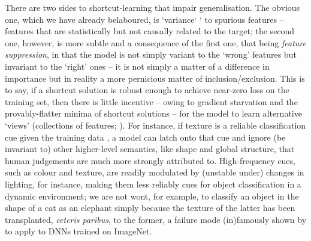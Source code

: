 There are two sides to shortcut-learning that impair generalisation.
%
The obvious one, which we have already belaboured, is `variance` ` to spurious features -- features
that are statistically but not causally related to the target; the second one, however, is more
subtle and a consequence of the first one, that being \emph{feature suppression}, in that the model
is not simply variant to the `wrong' features but invariant to the `right' ones -- it is not simply
a matter of a difference in importance but in reality a more pernicious matter of
inclusion/exclusion.
%
This is to say, if a shortcut solution is robust enough to achieve near-zero loss on the training
set, then there is little incentive -- owing to gradient starvation \citep{pezeshki2021gradient}
and the provably-flatter minima of shortcut solutions \citep{scimeca2021shortcut} -- for the model
to learn alternative `views' (collections of features; \cite{allen2020towards}).
%
For instance, if texture is a reliable classification cue given the training data
\cite{geirhos2018imagenet}, a model can latch onto that cue and ignore (be invariant to) other
higher-level semantics, like shape and global structure, that human judgements are much more
strongly attributed to.
%
High-frequency cues, such as colour and texture, are readily modulated by (unstable under) changes
in lighting, for instance, making them less reliably cues for object classification in a dynamic
environment; we are not wont, for example, to classify an object in the shape of a cat as an
elephant simply because the texture of the latter has been transplanted, \emph{ceteris paribus}, to
the former, a failure mode (in)famously shown by \cite{geirhos2018imagenet} to apply to DNNs
trained on ImageNet.

